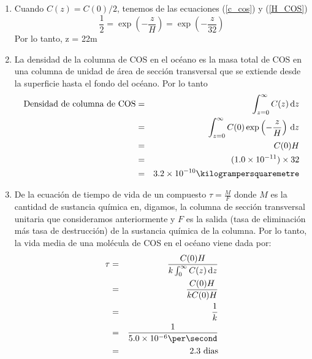 \begin{example}
\begin{enumerate}
\item Cuando $C(z)=C(0)/2$, tenemos de las ecuaciones (\ref{c_cos}) y  (\ref{H_COS}) 
\begin{equation*}
\frac{1}{2}=\exp\left(-\frac{z}{H} \right)=\exp\left( -\frac{z}{32}\right)
\end{equation*}
Por lo tanto, z = 22m
\item La densidad de la columna de COS en el océano es la masa total de COS en una columna de unidad de área de sección transversal que se extiende desde la superficie hasta el fondo del océano. Por lo tanto
\begin{eqnarray*}
\textrm{Densidad de columna de COS} &=& \int_{z=0}^\infty C(z)\,\mathrm{d}z \\
       &=&  \int_{z=0}^\infty C(0)\exp\left(-\frac{z}{H}\right)\,\mathrm{d}z  \\
       &=& C(0)H \\
       &=& (1.0\times10^{-11})\times 32 \\
       &=& 3.2\times10^{-10}\kilogrampersquaremetre 
\end{eqnarray*}
%
\item De la ecuación de tiempo de vida de un compuesto $\tau=\frac{M}{F}$
donde $M$ es la cantidad de sustancia química en, digamos, la columna de sección transversal unitaria que consideramos anteriormente y $F$ es la salida (tasa de eliminación más tasa de destrucción) de la sustancia química de la columna. Por lo tanto, la vida media de una molécula de COS en el océano viene dada por:
\begin{eqnarray*}
\tau & = & \frac{C(0)H}{k\int_0^\infty C(z)\,\mathrm{d}z } \\
& =& \frac{C(0)H}{kC(0)H}  \\ 
& =& \frac{1}{k}  \\ 
&=& \frac{1}{5.0\times10^{-6} \per\second}\\
&=& 2.3  \textrm{ dias} 
\end{eqnarray*}
\end{enumerate}
\end{example}
